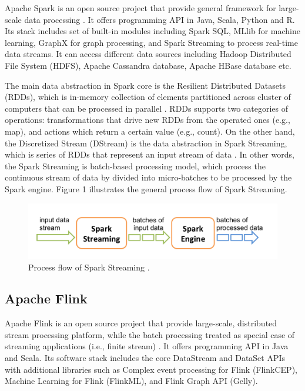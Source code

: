 \documentclass[]{article}
\begin{document}
\par Apache Spark is an open source project that provide general framework for large-scale data processing \cite{spark}. It offers programming API in Java, Scala, Python and R. Its stack includes set of built-in modules including Spark SQL, MLlib for machine learning, GraphX for graph processing, and Spark Streaming to process real-time data streams. It can access different data sources including Hadoop Distributed File System (HDFS), Apache Cassandra database, Apache HBase database etc.

\par The main data abstraction in Spark core is the Resilient Distributed Datasets (RDDs), which is in-memory collection of elements partitioned across cluster of computers that can be processed in parallel \cite{rdd}. RDDs supports two categories of operations: transformations that drive new RDDs from the operated ones (e.g., map), and actions which return a certain value (e.g., count). On the other hand, the Discretized Stream (DStream) is the data abstraction in Spark Streaming, which is series of RDDs that represent an input stream of data \cite{spark_streaming}. In other words, the Spark Streaming is batch-based processing model, which process the continuous stream of data by divided into micro-batches to be processed by the Spark engine. Figure 1 illustrates the general process flow of Spark Streaming. 


\begin{figure}[h]
 
  \centering
    \includegraphics[width=.9\textwidth, height=.2\textheight]{streaming-flow.png}
     \caption{ Process flow of Spark Streaming \cite{spark_streaming}.}
\end{figure} 

\subsection{Apache Flink}

\par Apache Flink is an open source project that provide large-scale, distributed stream processing platform, while the batch processing treated as special case of streaming applications (i.e., finite stream)  \cite{flink}.
It offers programming API in Java and Scala. Its software stack includes the core DataStream and DataSet APIs with additional libraries such as Complex event processing for Flink (FlinkCEP), Machine Learning for Flink (FlinkML), and Flink Graph API (Gelly).
\end{document}

